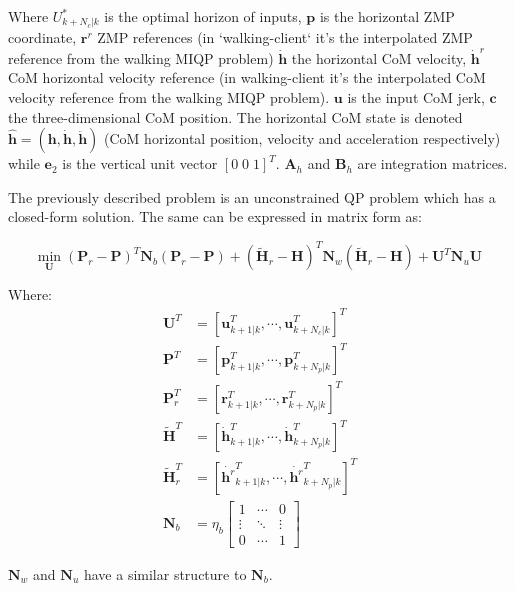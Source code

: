 \-Where ${U}_{k+N_c|k}^*$ is the optimal horizon of inputs, $\mathbf{p}$ is the horizontal \-Z\-M\-P coordinate, $ \mathbf{r}^r $ \-Z\-M\-P references (in `walking-\/client` it's the interpolated \-Z\-M\-P reference from the walking \-M\-I\-Q\-P problem) $ \mathbf{\dot{h}} $ the horizontal \-Co\-M velocity, $ \mathbf{\dot{h}}^r $ \-Co\-M horizontal velocity reference (in walking-\/client it's the interpolated \-Co\-M velocity reference from the walking \-M\-I\-Q\-P problem). $\mathbf{u}$ is the input \-Co\-M jerk, $\mathbf{c}$ the three-\/dimensional \-Co\-M position. \-The horizontal \-Co\-M state is denoted $\hat{\mathbf{h}} = (\mathbf{h}, \mathbf{\dot{h}}, \mathbf{\ddot{h}}) $ (\-Co\-M horizontal position, velocity and acceleration respectively) while $\mathbf{e}_2$ is the vertical unit vector $ [0\;0\;1]^T$. $\mathbf{A}_h$ and $\mathbf{B}_h$ are integration matrices.

\-The previously described problem is an unconstrained \-Q\-P problem which has a closed-\/form solution. \-The same can be expressed in matrix form as\-:

\[ \underset{\mathbf{U}}{\text{min}} \; (\mathbf{P}_r - \mathbf{P})^T \mathbf{N}_b (\mathbf{P}_r - \mathbf{P}) + (\tilde{\mathbf{H}}_r - \mathbf{H})^T\mathbf{N}_w(\tilde{\mathbf{H}}_r - \mathbf{H}) + \mathbf{U}^T\mathbf{N}_u \mathbf{U} \]

\-Where\-: \begin{align*} \mathbf{U}^T &= \left[ \mathbf{u}^T_{k+1|k}, \cdots, \mathbf{u}^T_{k+N_c|k} \right]^T \\ \mathbf{P}^T &= \left[ \mathbf{p}^T_{k+1|k}, \cdots, \mathbf{p}^T_{k+N_p|k} \right]^T \\ \mathbf{P}^T_r &= \left[ \mathbf{r}^T_{k+1|k}, \cdots, \mathbf{r}^T_{k+N_p|k} \right]^T \\ \mathbf{\tilde{H}}^T &= \left[ \dot{\mathbf{h}}^T_{k+1|k}, \cdots, \dot{\mathbf{h}}^T_{k+N_p|k} \right]^T \\ \mathbf{\tilde{H}}^T_r &= \left[ \dot{\mathbf{h}^r}^T_{k+1|k}, \cdots, \dot{\mathbf{h}^r}^T_{k+N_p|k} \right]^T \\ \mathbf{N}_b &= \eta_b\left[\begin{array}{ccc} 1 & \cdots & 0 \\ \vdots & \ddots & \vdots\\ 0 & \cdots & 1 \end{array}\right] \end{align*}

$\mathbf{N}_w$ and $\mathbf{N}_u$ have a similar structure to $\mathbf{N}_b$.

